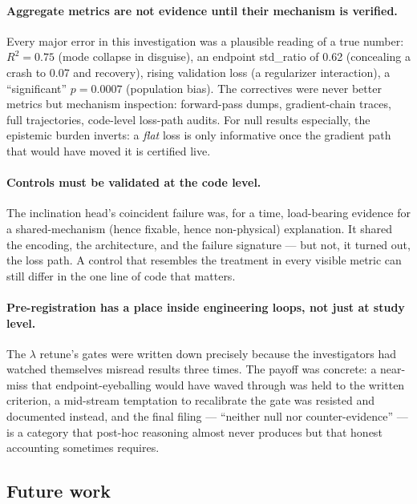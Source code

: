 \paragraph{Aggregate metrics are not evidence until their mechanism is verified.}
Every major error in this investigation was a plausible reading of a true number: $R^2 = 0.75$ (mode collapse in disguise), an endpoint std\_ratio of 0.62 (concealing a crash to 0.07 and recovery), rising validation loss (a regularizer interaction), a ``significant'' $p = 0.0007$ (population bias).
The correctives were never better metrics but mechanism inspection: forward-pass dumps, gradient-chain traces, full trajectories, code-level loss-path audits.
For null results especially, the epistemic burden inverts: a \emph{flat} loss is only informative once the gradient path that would have moved it is certified live.

\paragraph{Controls must be validated at the code level.}
The inclination head's coincident failure was, for a time, load-bearing evidence for a shared-mechanism (hence fixable, hence non-physical) explanation.
It shared the encoding, the architecture, and the failure signature --- but not, it turned out, the loss path.
A control that resembles the treatment in every visible metric can still differ in the one line of code that matters.

\paragraph{Pre-registration has a place inside engineering loops, not just at study level.}
The $\lambda$ retune's gates were written down precisely because the investigators had watched themselves misread results three times.
The payoff was concrete: a near-miss that endpoint-eyeballing would have waved through was held to the written criterion, a mid-stream temptation to recalibrate the gate was resisted and documented instead, and the final filing --- ``neither null nor counter-evidence'' --- is a category that post-hoc reasoning almost never produces but that honest accounting sometimes requires.

\subsection{Future work}
\label{sec:phicpsi:future}

